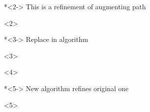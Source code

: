 \documentclass[fleqn]{beamer}
\begin{document}
{\begin{onlyenv}
      \isasnip\snipshortest
    \end{onlyenv}
  *<2-> This is a refinement of augmenting path
    \begin{onlyenv}<2>
      \vspace*{1em}
      
      \isasnip\snipsrefine
    \end{onlyenv}
  *<3-> Replace in algorithm
    \begin{onlyenv}<3>
      \vspace*{1em}
      
      \isasnip\snipalgoorig
    \end{onlyenv}
    \begin{onlyenv}<4>
      \vspace*{1em}
      
      \isasnip\snipalgorepl
    \end{onlyenv}
  
  *<5-> New algorithm refines original one
    \begin{onlyenv}<5>
      \vspace*{1em}
      
      \isasnip\snipalgoref
    \end{onlyenv}

}
\end{document}

